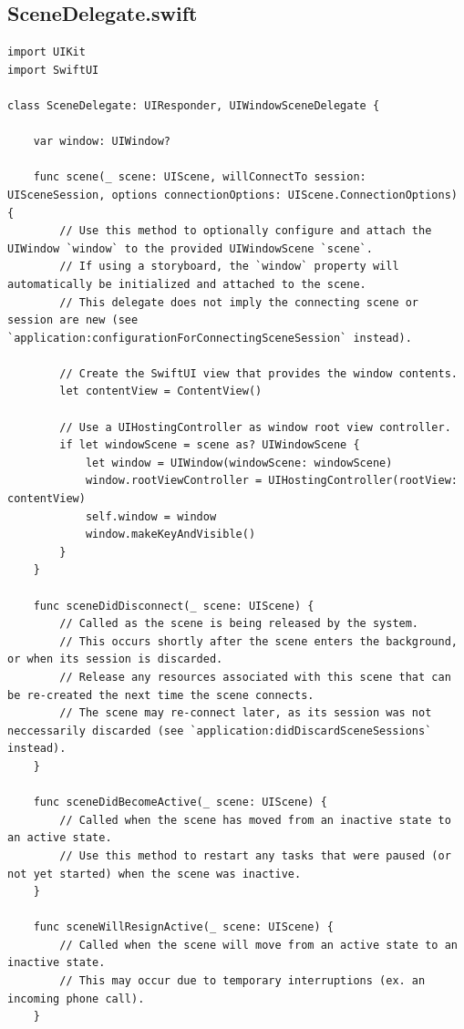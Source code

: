 \documentclass[a4paper,12pt]{article}
\begin{document}
\subsection{SceneDelegate.swift}
\label{sec:orgbd74243}
\lstset{breaklines=true,language=swift,label= ,caption= ,captionpos=b,firstnumber=1,numbers=left}
\begin{lstlisting}
import UIKit
import SwiftUI

class SceneDelegate: UIResponder, UIWindowSceneDelegate {

    var window: UIWindow?

    func scene(_ scene: UIScene, willConnectTo session: UISceneSession, options connectionOptions: UIScene.ConnectionOptions) {
        // Use this method to optionally configure and attach the UIWindow `window` to the provided UIWindowScene `scene`.
        // If using a storyboard, the `window` property will automatically be initialized and attached to the scene.
        // This delegate does not imply the connecting scene or session are new (see `application:configurationForConnectingSceneSession` instead).

        // Create the SwiftUI view that provides the window contents.
        let contentView = ContentView()

        // Use a UIHostingController as window root view controller.
        if let windowScene = scene as? UIWindowScene {
            let window = UIWindow(windowScene: windowScene)
            window.rootViewController = UIHostingController(rootView: contentView)
            self.window = window
            window.makeKeyAndVisible()
        }
    }

    func sceneDidDisconnect(_ scene: UIScene) {
        // Called as the scene is being released by the system.
        // This occurs shortly after the scene enters the background, or when its session is discarded.
        // Release any resources associated with this scene that can be re-created the next time the scene connects.
        // The scene may re-connect later, as its session was not neccessarily discarded (see `application:didDiscardSceneSessions` instead).
    }

    func sceneDidBecomeActive(_ scene: UIScene) {
        // Called when the scene has moved from an inactive state to an active state.
        // Use this method to restart any tasks that were paused (or not yet started) when the scene was inactive.
    }

    func sceneWillResignActive(_ scene: UIScene) {
        // Called when the scene will move from an active state to an inactive state.
        // This may occur due to temporary interruptions (ex. an incoming phone call).
    }


\end{lstlisting}
\end{document}
